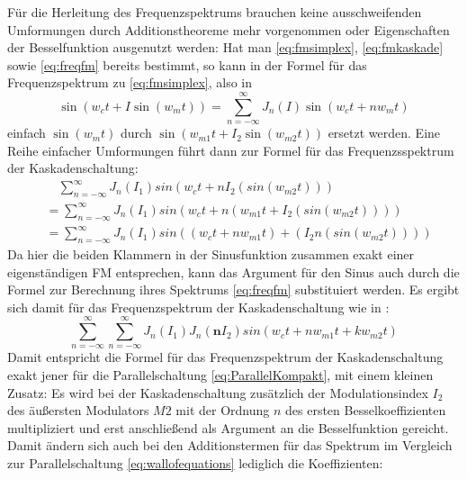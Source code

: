 Für die Herleitung des Frequenzspektrums brauchen keine ausschweifenden Umformungen durch Additionstheoreme mehr vorgenommen oder Eigenschaften der Besselfunktion ausgenutzt werden: Hat man \ref{eq:fmsimplex}, \ref{eq:fmkaskade} sowie \ref{eq:freqfm} bereits bestimmt, so kann in der Formel für das Frequenzspektrum zu \ref{eq:fmsimplex}, also in
\begin{equation}\label{eq:freqfm}
\sin(w_ct + I\sin(w_mt)) = \sum_{n=-\infty}^{\infty}J_n(I)\sin(w_ct+nw_mt)
\end{equation}
einfach $ \sin(w_mt) $ durch $ \sin(w_{m1}t + I_2\sin(w_{m2}t)) $ ersetzt werden. Eine Reihe einfacher Umformungen führt dann zur Formel für das Frequenzsspektrum der Kaskadenschaltung:
\begin{equation}
\begin{split}
& \quad \sum_{n=-\infty}^{\infty}J_n(I_1)sin(w_{c}t + nI_2(sin(w_{m2}t))) \\
&= \sum_{n=-\infty}^{\infty}J_n(I_1)sin(w_{c}t+n(w_{m1}t + I_2(sin(w_{m2}t)))) \\
&= \sum_{n=-\infty}^{\infty}J_n(I_1)sin((w_{c}t+nw_{m1}t) + (I_2n(sin(w_{m2}t))))
\end{split}
\end{equation}
Da hier die beiden Klammern in der Sinusfunktion zusammen exakt einer eigenständigen FM entsprechen, kann das Argument für den Sinus auch durch die Formel zur Berechnung ihres Spektrums \ref{eq:freqfm} substituiert werden. Es ergibt sich damit für das Frequenzspektrum der Kaskadenschaltung wie in \cite{schottiWeb}:
\begin{equation}
\sum_{n=-\infty}^{\infty}\sum_{n=-\infty}^{\infty}J_n(I_1)J_n(\mathbf{n}I_2)sin(w_{c}t+nw_{m1}t + kw_{m2}t)
\end{equation}
Damit entspricht die Formel für das Frequenzspektrum der Kaskadenschaltung exakt jener für die Parallelschaltung \ref{eq:ParallelKompakt}, mit einem kleinen Zusatz: Es wird bei der Kaskadenschaltung zusätzlich der Modulationsindex $ I_2 $ des äußersten Modulators $M2$ mit der Ordnung $ n $ des ersten Besselkoeffizienten multipliziert und erst anschließend als Argument an die Besselfunktion gereicht. Damit ändern sich auch bei den Additionstermen für das Spektrum im Vergleich zur Parallelschaltung \ref{eq:wallofequations} lediglich die Koeffizienten:
